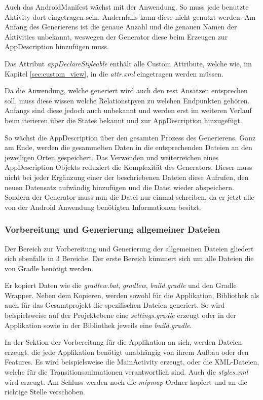 Auch das AndroidManifest wächst mit der Anwendung. So muss jede benutzte Aktivity dort eingetragen sein. Andernfalls kann diese nicht genutzt werden. Am Anfang des Generierens ist die genaue Anzahl und die genauen Namen der Aktivities unbekannt, weswegen der Generator diese beim Erzeugen zur AppDescription hinzufügen muss. 

Das Attribut \textit{appDeclareStyleable} enthält alle Custom Attribute, welche wie, im Kapitel \ref{sec:custom_view}, in die \textit{attr.xml} eingetragen werden müssen.

Da die Anwendung, welche generiert wird auch den \acf{rest} Ansätzen entsprechen soll, muss diese wissen welche Relationstpyen zu welchen Endpunkten gehören. Anfangs sind diese jedoch auch unbekannt und werden erst im weiteren Verlauf beim iterieren über die States bekannt und zur AppDescription hinzugefügt.

So wächst die AppDescription über den gesamten Prozess des Generierens. Ganz am Ende, werden die gesammelten Daten in die entsprechenden Dateien an den jeweiligen Orten gespeichert. Das Verwenden und weiterreichen eines AppDescription Objekts reduziert die Komplexität des Generators. Dieser muss nicht bei jeder Ergänzung einer der beschriebenen Dateien diese Aufrufen, den neuen Datensatz aufwändig hinzufügen und die Datei wieder abspeichern. Sondern der Generator muss nun die Datei nur einmal schreiben, da er jetzt alle von der Android Anwendung benötigten Informationen besitzt.

\subsubsection{Vorbereitung und Generierung allgemeiner Dateien}

Der Bereich zur Vorbereitung und Generierung der allgemeinen Dateien gliedert sich ebenfalls in 3 Bereiche. Der erste Bereich kümmert sich um alle Dateien die von Gradle benötigt werden. 

Er kopiert Daten wie die \textit{gradlew.bat}, \textit{gradlew}, \textit{build.gradle} und den Gradle Wrapper. 
Neben dem Kopieren, werden sowohl für die Applikation, Bibliothek als auch für das Gesamtprojekt die spezifischen Dateien generiert. So wird beispielsweise auf der Projektebene eine \textit{settings.gradle} erzeugt oder in der Applikation sowie in der Bibliothek jeweils eine \textit{build.gradle}.

In der Sektion der Vorbereitung für die Applikation an sich, werden Dateien erzeugt, die jede Applikation benötigt unabhängig von ihrem Aufbau oder den Features. Es wird beispielsweise die MainActivity erzeugt, oder die XML-Dateien, welche für die Transitionsanimationen verantwortlich sind. Auch die \textit{styles.xml} wird erzeugt. Am Schluss werden noch die \textit{mipmap}-Ordner kopiert und an die richtige Stelle verschoben.

